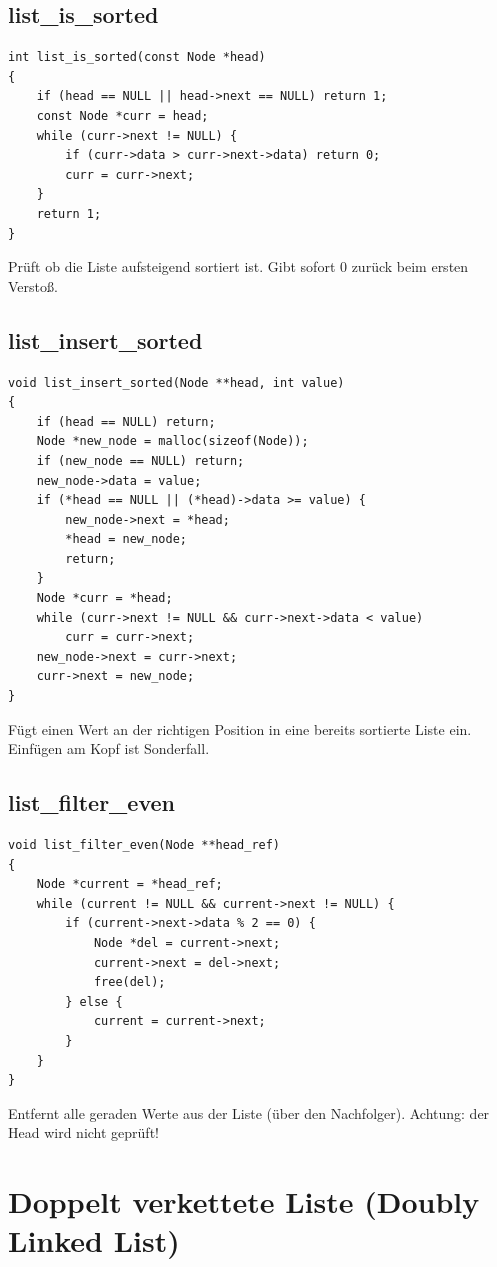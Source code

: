 \documentclass[10pt, a4paper]{article}
\begin{document}
\subsection{list\_is\_sorted}
\begin{lstlisting}
int list_is_sorted(const Node *head)
{
    if (head == NULL || head->next == NULL) return 1;
    const Node *curr = head;
    while (curr->next != NULL) {
        if (curr->data > curr->next->data) return 0;
        curr = curr->next;
    }
    return 1;
}
\end{lstlisting}
Pr\"uft ob die Liste aufsteigend sortiert ist. Gibt sofort 0 zur\"uck beim ersten Verstoß.

\subsection{list\_insert\_sorted}
\begin{lstlisting}
void list_insert_sorted(Node **head, int value)
{
    if (head == NULL) return;
    Node *new_node = malloc(sizeof(Node));
    if (new_node == NULL) return;
    new_node->data = value;
    if (*head == NULL || (*head)->data >= value) {
        new_node->next = *head;
        *head = new_node;
        return;
    }
    Node *curr = *head;
    while (curr->next != NULL && curr->next->data < value)
        curr = curr->next;
    new_node->next = curr->next;
    curr->next = new_node;
}
\end{lstlisting}
F\"ugt einen Wert an der richtigen Position in eine bereits sortierte Liste ein. Einf\"ugen am Kopf ist Sonderfall.

\subsection{list\_filter\_even}
\begin{lstlisting}
void list_filter_even(Node **head_ref)
{
    Node *current = *head_ref;
    while (current != NULL && current->next != NULL) {
        if (current->next->data % 2 == 0) {
            Node *del = current->next;
            current->next = del->next;
            free(del);
        } else {
            current = current->next;
        }
    }
}
\end{lstlisting}
Entfernt alle geraden Werte aus der Liste (\"uber den Nachfolger). Achtung: der Head wird nicht gepr\"uft!

\newpage
\section{Doppelt verkettete Liste (Doubly Linked List)}
\end{document}
